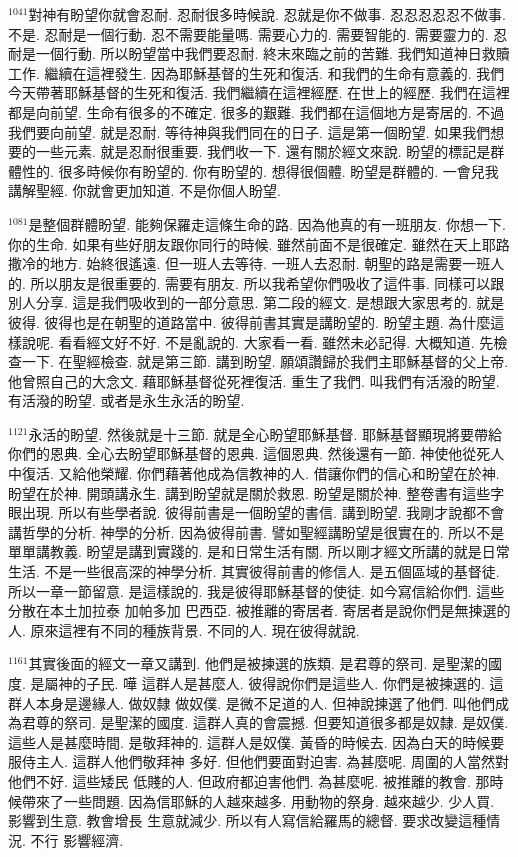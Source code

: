 \documentclass{book}
\begin{document}
$^{1041}$對神有盼望你就會忍耐.
忍耐很多時候說.
忍就是你不做事.
忍忍忍忍忍不做事.
不是.
忍耐是一個行動.
忍不需要能量嗎.
需要心力的.
需要智能的.
需要靈力的.
忍耐是一個行動.
所以盼望當中我們要忍耐.
終末來臨之前的苦難.
我們知道神日救贖工作.
繼續在這裡發生.
因為耶穌基督的生死和復活.
和我們的生命有意義的.
我們今天帶著耶穌基督的生死和復活.
我們繼續在這裡經歷.
在世上的經歷.
我們在這裡都是向前望.
生命有很多的不確定.
很多的艱難.
我們都在這個地方是寄居的.
不過我們要向前望.
就是忍耐.
等待神與我們同在的日子.
這是第一個盼望.
如果我們想要的一些元素.
就是忍耐很重要.
我們收一下.
還有關於經文來說.
盼望的標記是群體性的.
很多時候你有盼望的.
你有盼望的.
想得很個體.
盼望是群體的.
一會兒我講解聖經.
你就會更加知道.
不是你個人盼望.

$^{1081}$是整個群體盼望.
能夠保羅走這條生命的路.
因為他真的有一班朋友.
你想一下.
你的生命.
如果有些好朋友跟你同行的時候.
雖然前面不是很確定.
雖然在天上耶路撒冷的地方.
始終很遙遠.
但一班人去等待.
一班人去忍耐.
朝聖的路是需要一班人的.
所以朋友是很重要的.
需要有朋友.
所以我希望你們吸收了這件事.
同樣可以跟別人分享.
這是我們吸收到的一部分意思.
第二段的經文.
是想跟大家思考的.
就是彼得.
彼得也是在朝聖的道路當中.
彼得前書其實是講盼望的.
盼望主題.
為什麼這樣說呢.
看看經文好不好.
不是亂說的.
大家看一看.
雖然未必記得.
大概知道.
先檢查一下.
在聖經檢查.
就是第三節.
講到盼望.
願頌讚歸於我們主耶穌基督的父上帝.
他曾照自己的大念文.
藉耶穌基督從死裡復活.
重生了我們.
叫我們有活潑的盼望.
有活潑的盼望.
或者是永生永活的盼望.

$^{1121}$永活的盼望.
然後就是十三節.
就是全心盼望耶穌基督.
耶穌基督顯現將要帶給你們的恩典.
全心去盼望耶穌基督的恩典.
這個恩典.
然後還有一節.
神使他從死人中復活.
又給他榮耀.
你們藉著他成為信教神的人.
借讓你們的信心和盼望在於神.
盼望在於神.
開頭講永生.
講到盼望就是關於救恩.
盼望是關於神.
整卷書有這些字眼出現.
所以有些學者說.
彼得前書是一個盼望的書信.
講到盼望.
我剛才說都不會講哲學的分析.
神學的分析.
因為彼得前書.
譬如聖經講盼望是很實在的.
所以不是單單講教義.
盼望是講到實踐的.
是和日常生活有關.
所以剛才經文所講的就是日常生活.
不是一些很高深的神學分析.
其實彼得前書的修信人.
是五個區域的基督徒.
所以一章一節留意.
是這樣說的.
我是彼得耶穌基督的使徒.
如今寫信給你們.
這些分散在本土加拉泰 加帕多加 巴西亞.
被推離的寄居者.
寄居者是說你們是無揀選的人.
原來這裡有不同的種族背景.
不同的人.
現在彼得就說.

$^{1161}$其實後面的經文一章又講到.
他們是被揀選的族類.
是君尊的祭司.
是聖潔的國度.
是屬神的子民.
嘩 這群人是甚麼人.
彼得說你們是這些人.
你們是被揀選的.
這群人本身是邊緣人.
做奴隸 做奴僕.
是微不足道的人.
但神說揀選了他們.
叫他們成為君尊的祭司.
是聖潔的國度.
這群人真的會震撼.
但要知道很多都是奴隸.
是奴僕.
這些人是甚麼時間.
是敬拜神的.
這群人是奴僕.
黃昏的時候去.
因為白天的時候要服侍主人.
這群人他們敬拜神 多好.
但他們要面對迫害.
為甚麼呢.
周圍的人當然對他們不好.
這些矮民 低賤的人.
但政府都迫害他們.
為甚麼呢.
被推離的教會.
那時候帶來了一些問題.
因為信耶穌的人越來越多.
用動物的祭身.
越來越少.
少人買.
影響到生意.
教會增長 生意就減少.
所以有人寫信給羅馬的總督.
要求改變這種情況.
不行 影響經濟.
\end{document}
